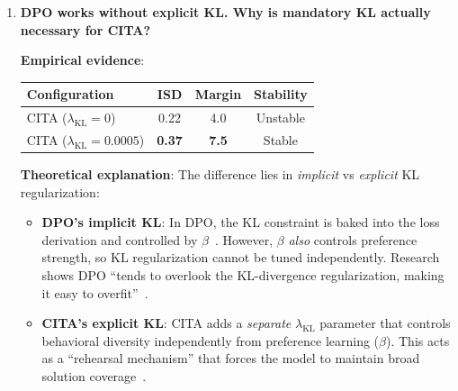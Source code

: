 \begin{enumerate}[label=\textbf{Q\arabic*.}, leftmargin=*, itemsep=8pt]
\textbf{Why the gap?} Prompting operates at the surface level---the model \textit{follows} instructions but doesn't \textit{internalize} them. CITA trains instruction-conditioned preferences into the weights, making behavioral changes robust to adversarial prompt injections.

\textbf{Jailbreak resistance}: Prompt-based control is trivially bypassed by ``ignore previous instructions.'' CITA's trained behavior resists such attacks.

\vspace{4mm}

\item \textbf{DPO works without explicit KL. Why is mandatory KL actually necessary for CITA?}

 \textbf{Empirical evidence}:

\begin{table}[H]
\centering
\small
\begin{tabular}{@{}lccc@{}}
\toprule
\textbf{Configuration} & \textbf{ISD} & \textbf{Margin} & \textbf{Stability} \\
\midrule
CITA ($\lambda_{\text{KL}}=0$) & 0.22 & 4.0 & Unstable \\
\hline
CITA ($\lambda_{\text{KL}}=0.0005$) & \textbf{0.37} & \textbf{7.5} & Stable \\
\bottomrule
\end{tabular}
\end{table}

\textbf{Theoretical explanation}: The difference lies in \textit{implicit} vs \textit{explicit} KL regularization:

\begin{itemize}[leftmargin=*,itemsep=2pt]
    \item \textbf{DPO's implicit KL}: In DPO, the KL constraint is baked into the loss derivation and controlled by $\beta$~\cite{rafailov2023direct}. However, $\beta$ \textit{also} controls preference strength, so KL regularization cannot be tuned independently. Research shows DPO ``tends to overlook the KL-divergence regularization, making it easy to overfit''~\cite{tang2024understanding}.

    \item \textbf{CITA's explicit KL}: CITA adds a \textit{separate} $\lambda_{\text{KL}}$ parameter that controls behavioral diversity independently from preference learning ($\beta$). This acts as a ``rehearsal mechanism'' that forces the model to maintain broad solution coverage~\cite{wang2024comprehensive}.
\end{itemize}


\end{enumerate}
